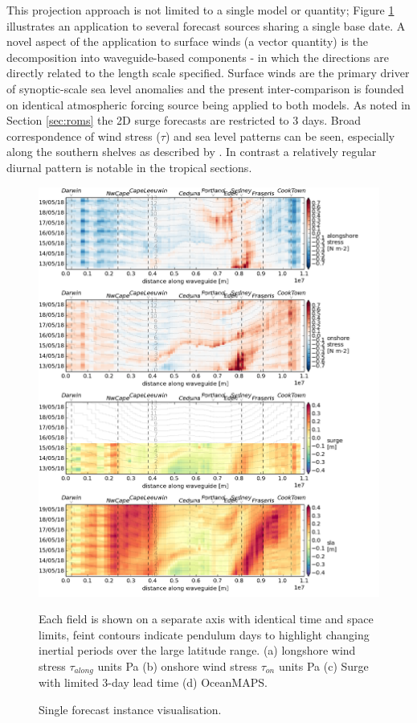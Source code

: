 This projection approach is not limited to a single model or quantity; Figure \ref{fig:collate_g} illustrates an application to several forecast sources sharing a single base date.
A novel aspect of the application to surface winds (a vector quantity) is the decomposition into waveguide-based components - in which the directions are directly related to the length scale specified.
Surface winds are the primary driver of synoptic-scale sea level anomalies and the present inter-comparison is founded on identical atmospheric forcing source being applied to both models. As noted in Section \ref{sec:roms} the 2D surge forecasts are restricted to 3 days.
Broad correspondence of wind stress ($\tau$) and sea level patterns can be seen, especially along the southern shelves as described by \citep{McInnes:2003vl}.
In contrast a relatively regular diurnal pattern is notable in the tropical sections.
\begin{figure}[!hbt] \centering
    \includegraphics[width=\figwidthFull]{figures/plots/collate_g.png}
    \caption{Single forecast instance visualisation.}
    {Each field is shown on a separate axis with identical time and space limits, feint contours indicate pendulum days to highlight changing inertial periods over the large latitude range. (a) longshore wind stress $\tau_{along}$ units Pa (b) onshore wind stress $\tau_{on}$ units Pa (c) Surge with limited 3-day lead time (d) OceanMAPS.}
    \label{fig:collate_g}
\end{figure}  
